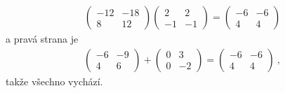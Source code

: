 \begin{example}
\begin{align}
        \begin{pmatrix}
            -12 & -18 \\ 8 & 12
        \end{pmatrix}
        \begin{pmatrix}
            2 & 2 \\ -1 & -1 
        \end{pmatrix}
        =
        \begin{pmatrix}
            -6 & -6 \\ 4 & 4
        \end{pmatrix}
    \end{align}
    a pravá strana je \begin{align}
        \begin{pmatrix}
            -6 & -9 \\ 4 & 6
        \end{pmatrix}
        +
        \begin{pmatrix}
            0 & 3 \\ 0 & -2
        \end{pmatrix}
        =
        \begin{pmatrix}
            -6 & -6 \\ 4 & 4
        \end{pmatrix} \:,
    \end{align}
    takže všechno vychází.
\end{example}




